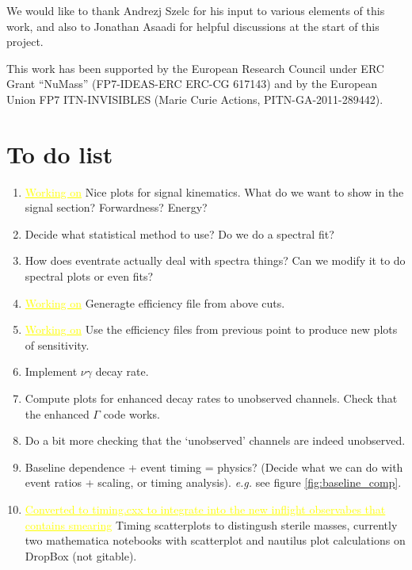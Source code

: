 \documentclass[11pt, a4paper]{article}
\newcommand{\newtext}[2]{\textcolor{#1}{\ul{#2}}}
\begin{document}
\acknowledgments

We would like to thank Andrezj Szelc for his input to various elements of this
work, and also to Jonathan Asaadi for helpful discussions at the start of this
project.

This work has been supported by the European Research Council under ERC Grant
“NuMass” (FP7-IDEAS-ERC ERC-CG 617143) and by the European Union FP7
ITN-INVISIBLES (Marie Curie Actions, PITN-GA-2011-289442).

\appendix

\section{To do list}

\begin{enumerate}

	\item \newtext{MARK}{Working on} Nice plots for signal kinematics. What do we want to show in the signal
section? Forwardness? Energy? 

\item Decide what statistical method to use? Do we do a spectral fit?

\item How does eventrate actually deal with spectra things? Can we modify it to 
do spectral plots or even fits?


\item \newtext{MARK}{Working on} Generagte efficiency file from above cuts.

\item \newtext{MARK}{Working on} Use the efficiency files from previous point to produce new plots of
sensitivity.

\item Implement $\nu\gamma$ decay rate. 

\item Compute plots for enhanced decay rates to unobserved channels. Check that
the enhanced $\Gamma$ code works.

\item Do a bit more checking that the `unobserved' channels are indeed unobserved.

\item Baseline dependence + event timing = physics? (Decide what we can do with
event ratios + scaling, or timing analysis).  \emph{e.g.} see figure
\ref{fig:baseline_comp}.

\item \newtext{MARK}{Converted to timing.cxx to integrate into the new inflight observabes that contains smearing} Timing scatterplots to distingush sterile masses, currently two mathematica notebooks with scatterplot and nautilus plot calculations on DropBox (not gitable).


\end{enumerate}
\end{document}
